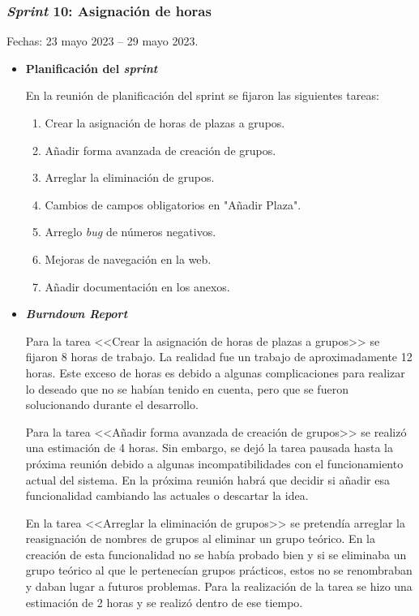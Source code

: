 \subsubsection{\textit{Sprint} 10: Asignación de horas}
Fechas: 23 mayo 2023 -- 29 mayo 2023.
\begin{itemize}
\item\textbf{Planificación del \textit{sprint}}

En la reunión de planificación del sprint se fijaron las siguientes tareas:
\begin{enumerate}
		\item Crear la asignación de horas de plazas a grupos.
		\item Añadir forma avanzada de creación de grupos.
		\item Arreglar la eliminación de grupos.
		\item Cambios de campos obligatorios en "Añadir Plaza".
		\item Arreglo \textit{bug} de números negativos.
		\item Mejoras de navegación en la web.
		\item Añadir documentación en los anexos.
\end{enumerate}

\item\textbf{\textit{Burndown Report}}

Para la tarea <<Crear la asignación de horas de plazas a grupos>> se fijaron 8 horas de trabajo.
La realidad fue un trabajo de aproximadamente 12 horas.
Este exceso de horas es debido a algunas complicaciones para realizar lo deseado que no se habían tenido en cuenta, pero que se fueron solucionando durante el desarrollo.

Para la tarea <<Añadir forma avanzada de creación de grupos>> se realizó una estimación de 4 horas.
Sin embargo, se dejó la tarea pausada hasta la próxima reunión debido a algunas incompatibilidades con el funcionamiento actual del sistema.
En la próxima reunión habrá que decidir si añadir esa funcionalidad cambiando las actuales o descartar la idea.

En la tarea <<Arreglar la eliminación de grupos>> se pretendía arreglar la reasignación de nombres de grupos al eliminar un grupo teórico.
En la creación de esta funcionalidad no se había probado bien y si se eliminaba un grupo teórico al que le pertenecían grupos prácticos, estos no se renombraban y daban lugar a futuros problemas.
Para la realización de la tarea se hizo una estimación de 2 horas y se realizó dentro de ese tiempo.


\end{itemize}
